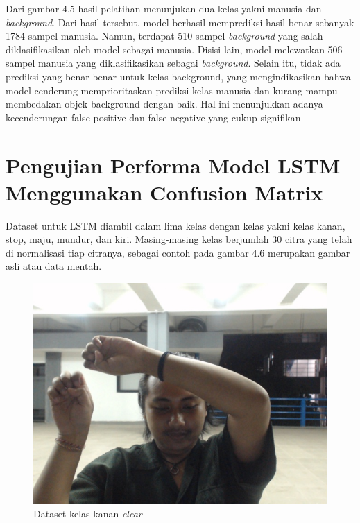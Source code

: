 Dari gambar 4.5 hasil pelatihan menunjukan dua kelas yakni manusia dan \emph{background}.
Dari hasil tersebut, model berhasil memprediksi hasil benar sebanyak 1784 sampel manusia. 
Namun, terdapat 510 sampel \emph{background} yang salah diklasifikasikan oleh model sebagai manusia. Disisi lain, model melewatkan 
506 sampel manusia yang diklasifikasikan sebagai \emph{background}. Selain itu, tidak ada prediksi yang benar-benar untuk kelas background,
yang mengindikasikan bahwa model cenderung memprioritaskan prediksi kelas manusia dan kurang mampu membedakan objek background dengan baik.
Hal ini menunjukkan adanya kecenderungan false positive dan false negative yang cukup signifikan

\section{Pengujian Performa Model LSTM Menggunakan Confusion Matrix}
Dataset untuk LSTM diambil dalam lima kelas dengan kelas yakni kelas kanan, stop, maju, mundur, dan kiri. Masing-masing kelas berjumlah 30 citra yang
telah di normalisasi tiap citranya, sebagai contoh pada gambar 4.6 merupakan gambar asli atau data mentah.
\begin{figure} [H] \centering
  \includegraphics[scale=0.2]{gambar/0-clear.jpg}
  \caption{Dataset kelas kanan \emph{clear}}
  \label{fig:Data set kelas kanan raw}
\end{figure}

